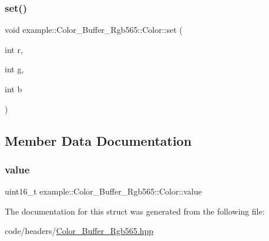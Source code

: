 \mbox{\label{structexample_1_1_color___buffer___rgb565_1_1_color_a78ef03cc7c363dd9ab41add324d0054c}} 
\subsubsection{\texorpdfstring{set()}{set()}}
{\footnotesize\ttfamily void example\+::\+Color\+\_\+\+Buffer\+\_\+\+Rgb565\+::\+Color\+::set (\begin{DoxyParamCaption}\item[{int}]{r,  }\item[{int}]{g,  }\item[{int}]{b }\end{DoxyParamCaption})\hspace{0.3cm}{\ttfamily [inline]}}



\subsection{Member Data Documentation}
\mbox{\label{structexample_1_1_color___buffer___rgb565_1_1_color_adca47da57dc30002d9f8f40f292a7fae}} 
\subsubsection{\texorpdfstring{value}{value}}
{\footnotesize\ttfamily uint16\+\_\+t example\+::\+Color\+\_\+\+Buffer\+\_\+\+Rgb565\+::\+Color\+::value}



The documentation for this struct was generated from the following file\+:\begin{DoxyCompactItemize}
\item 
code/headers/\mbox{\hyperlink{_color___buffer___rgb565_8hpp}{Color\+\_\+\+Buffer\+\_\+\+Rgb565.\+hpp}}\end{DoxyCompactItemize}
